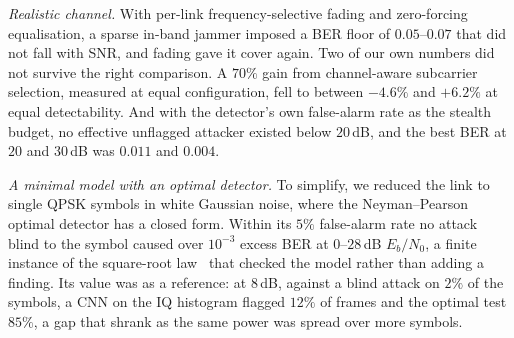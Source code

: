 \textit{Realistic channel.}
With per-link frequency-selective fading and zero-forcing equalisation, a sparse in-band jammer imposed
a BER floor of $0.05$--$0.07$ that did not fall with SNR, and fading gave it cover again.
Two of our own numbers did not survive the right comparison.
A $70\%$ gain from channel-aware subcarrier selection, measured at equal configuration, fell to between
$-4.6\%$ and $+6.2\%$ at equal detectability.
And with the detector's own false-alarm rate as the stealth budget, no effective unflagged attacker
existed below $20$\,dB, and the best BER at $20$ and $30$\,dB was $0.011$ and $0.004$.

\textit{A minimal model with an optimal detector.}
To simplify, we reduced the link to single QPSK symbols in white Gaussian noise, where the Neyman--Pearson optimal detector has a closed form.
Within its $5\%$ false-alarm rate no attack blind to the symbol caused over $10^{-3}$ excess BER at $0$--$28$\,dB $E_b/N_0$, a finite instance of the square-root law~\cite{TODO-key} that checked the model rather than adding a finding.
Its value was as a reference: at $8$\,dB, against a blind attack on $2\%$ of the symbols, a CNN on the IQ histogram flagged $12\%$ of frames and the optimal test $85\%$, a gap that shrank as the same power was spread over more symbols.


